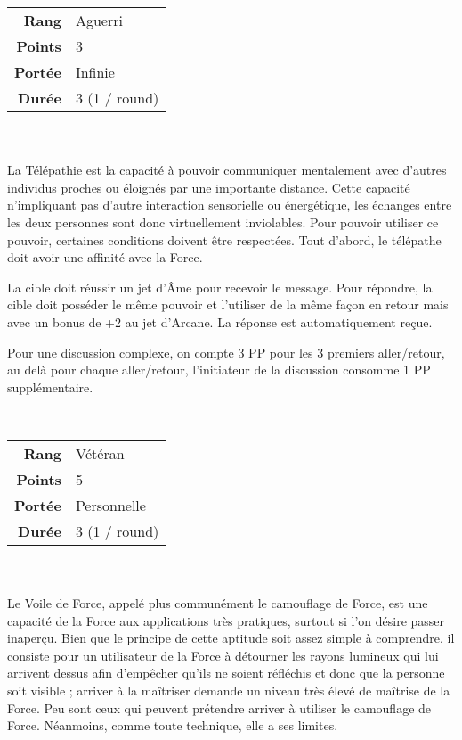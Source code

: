 \begin{description}[align=left]
        \begin{tabular}{ r l }
            \textbf{Rang}    & Aguerri \\
            \textbf{Points}  & 3 \\
            \textbf{Portée}  & Infinie \\
            \textbf{Durée}   & 3 (1 / round) \\
        \end{tabular}
        \\ \\
        La Télépathie est la capacité à pouvoir communiquer mentalement avec d’autres individus proches ou éloignés par une importante distance. Cette capacité n’impliquant pas d’autre interaction sensorielle ou énergétique, les échanges entre les deux personnes sont donc virtuellement inviolables. Pour pouvoir utiliser ce pouvoir, certaines conditions doivent être respectées. Tout d’abord, le télépathe doit avoir une affinité avec la Force. 

        La cible doit réussir un jet d'\^Ame pour recevoir le message. Pour répondre, la cible doit posséder le même pouvoir et l’utiliser de la même façon en retour mais avec un bonus de +2 au jet d’Arcane. La réponse est automatiquement reçue.

        Pour une discussion complexe, on compte 3 PP pour les 3 premiers aller/retour, au delà pour chaque aller/retour, l’initiateur de la discussion consomme 1 PP supplémentaire.
        \\

    \item [Voile de Force] ~ \\

        \begin{tabular}{ r l }
            \textbf{Rang}    & Vétéran \\
            \textbf{Points}  & 5 \\
            \textbf{Portée}  & Personnelle \\
            \textbf{Durée}   & 3 (1 / round) \\
        \end{tabular}
        \\ \\
        Le Voile de Force, appelé plus communément le camouflage de Force, est une capacité de la Force aux applications très pratiques, surtout si l’on désire passer inaperçu. Bien que le principe de cette aptitude soit assez simple à comprendre, il consiste pour un utilisateur de la Force à détourner les rayons lumineux qui lui arrivent dessus afin d’empêcher qu’ils ne soient réfléchis et donc que la personne soit visible ; arriver à la maîtriser demande un niveau très élevé de maîtrise de la Force. Peu sont ceux qui peuvent prétendre arriver à utiliser le camouflage de Force. Néanmoins, comme toute technique, elle a ses limites.


\end{description}
